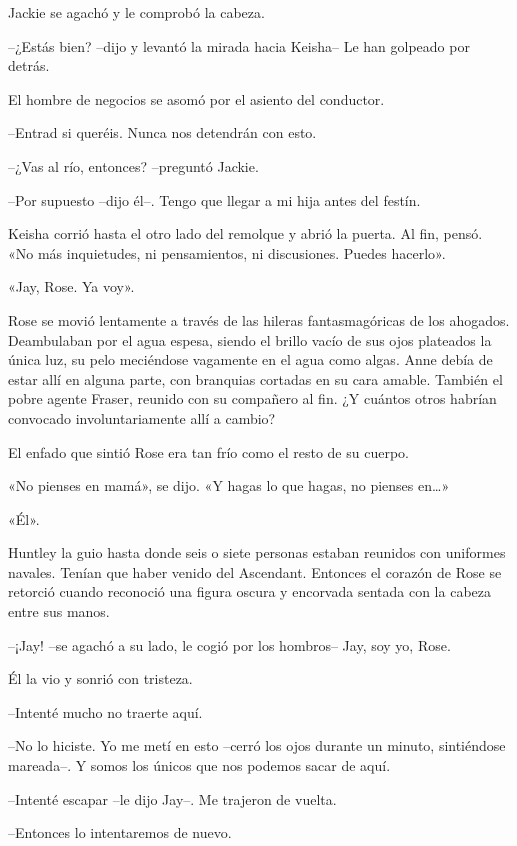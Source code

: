 {Jackie se agachó y le comprobó la cabeza.}

{--¿Estás bien? --dijo y levantó la mirada hacia Keisha-- Le han
golpeado por detrás.}

{El hombre de negocios se asomó por el asiento del conductor.}

{--Entrad si queréis. Nunca nos detendrán con esto.}

{--¿Vas al río, entonces? --preguntó Jackie.}

{--Por supuesto --dijo él--. Tengo que llegar a mi hija antes del
festín.}

{Keisha corrió hasta el otro lado del remolque y abrió la puerta. Al
 fin, pensó. «No más inquietudes, ni pensamientos, ni discusiones. Puedes
hacerlo».}

{«Jay, Rose. Ya voy».}

\mbox{}

{Rose se movió lentamente a través de las hileras fantasmagóricas de los
 ahogados. Deambulaban por el agua espesa, siendo el brillo vacío de sus
 ojos plateados la única luz, su pelo meciéndose vagamente en el agua
 como algas. Anne debía de estar allí en alguna parte, con branquias
 cortadas en su cara amable. También el pobre agente Fraser, reunido con
 su compañero al fin. ¿Y cuántos otros habrían convocado
involuntariamente allí a cambio?}

{El enfado que sintió Rose era tan frío como el resto de su cuerpo.}

{«No pienses en mamá», se dijo. «Y hagas lo que hagas, no pienses
 en\ldots{}»}

{«Él».}

{Huntley la guio hasta donde seis o siete personas estaban reunidos con
 uniformes navales. Tenían que haber venido del Ascendant. Entonces el
 corazón de Rose se retorció cuando reconoció una figura oscura y
encorvada sentada con la cabeza entre sus manos.}

{--¡Jay! --se agachó a su lado, le cogió por los hombros-- Jay, soy yo,
Rose.}

{Él la vio y sonrió con tristeza.}

{--Intenté mucho no traerte aquí.}

{--No lo hiciste. Yo me metí en esto --cerró los ojos durante un minuto,
 sintiéndose mareada--. Y somos los únicos que nos podemos sacar de
aquí.}

{--Intenté escapar --le dijo Jay--. Me trajeron de vuelta.}

{--Entonces lo intentaremos de nuevo.}


